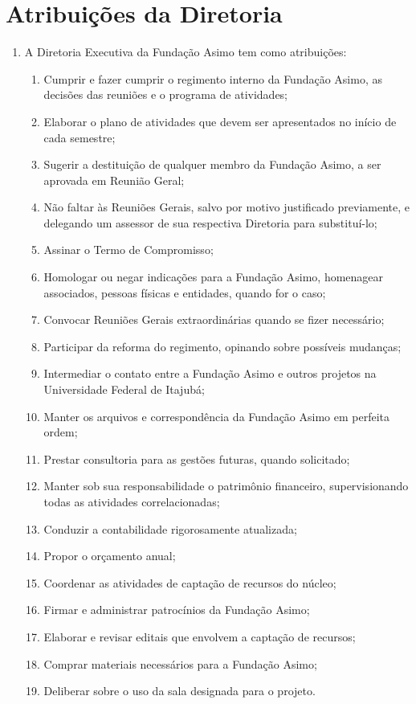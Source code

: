     \section{Atribuições da Diretoria}
    \begin{enumerate}
        \item A Diretoria Executiva da Fundação Asimo tem como atribuições:
         \begin{enumerate}
            \item Cumprir e fazer cumprir o regimento interno da Fundação Asimo, as decisões das reuniões e o programa de atividades;
            \item Elaborar o plano de atividades que devem ser apresentados no início de cada semestre;
            \item Sugerir a destituição de qualquer membro da Fundação Asimo, a ser aprovada em Reunião Geral;
            \item Não faltar às Reuniões Gerais, salvo por motivo justificado previamente, e delegando um assessor de sua respectiva Diretoria para substituí-lo;
            \item Assinar o Termo de Compromisso;
            \item Homologar ou negar indicações para a Fundação Asimo, homenagear associados, pessoas físicas e entidades, quando for o caso;
            \item Convocar Reuniões Gerais extraordinárias quando se fizer necessário;
            \item Participar da reforma do regimento, opinando sobre possíveis mudanças;
            \item Intermediar o contato entre a Fundação Asimo e outros projetos na Universidade Federal de Itajubá;
            \item Manter os arquivos e correspondência da Fundação Asimo em perfeita ordem;
            \item Prestar consultoria para as gestões futuras, quando solicitado;
            \item Manter sob sua responsabilidade o patrimônio financeiro, supervisionando todas as atividades correlacionadas;
            \item Conduzir a contabilidade rigorosamente atualizada;
            \item Propor o orçamento anual;
            \item Coordenar as atividades de captação de recursos do núcleo;
            \item Firmar e administrar patrocínios da Fundação Asimo;
            \item Elaborar e revisar editais que envolvem a captação de recursos;
            \item Comprar materiais necessários para a Fundação Asimo;
            \item Deliberar sobre o uso da sala designada para o projeto.
        \end{enumerate}
    \end{enumerate}
